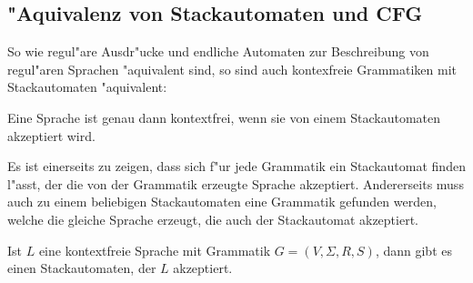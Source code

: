 \subsection{"Aquivalenz von Stackautomaten und CFG}
So wie regul"are Ausdr"ucke und endliche Automaten zur Beschreibung
von regul"aren Sprachen "aquivalent sind, so sind auch kontexfreie Grammatiken
mit Stackautomaten "aquivalent:

\begin{satz}
Eine Sprache ist genau dann kontextfrei, wenn sie von einem
Stackautomaten akzeptiert wird.
\end{satz}

Es ist einerseits zu zeigen, dass sich f"ur jede Grammatik ein Stackautomat
finden l"asst, der die von der Grammatik erzeugte Sprache akzeptiert.
Andererseits muss auch zu einem beliebigen Stackautomaten eine 
Grammatik gefunden werden, welche die gleiche Sprache erzeugt, die
auch der Stackautomat akzeptiert.

\begin{hilfssatz}\label{hilfssatz_cfg_to_pushdown}
Ist $L$ eine kontextfreie Sprache mit Grammatik $G=(V,\Sigma,R,S)$,
dann gibt es einen Stackautomaten, der $L$ akzeptiert.
\end{hilfssatz}

